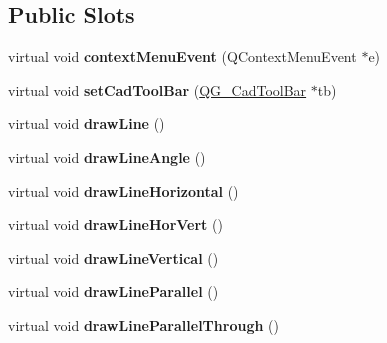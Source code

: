 \subsection*{Public Slots}
\begin{DoxyCompactItemize}
\item 
\hypertarget{classQG__CadToolBarLines_aff255f21be27cca5a8a2a75b50db5bf6}{virtual void {\bfseries context\-Menu\-Event} (Q\-Context\-Menu\-Event $\ast$e)}\label{classQG__CadToolBarLines_aff255f21be27cca5a8a2a75b50db5bf6}

\item 
\hypertarget{classQG__CadToolBarLines_a2cef003c3cb4285717c771850bcdea9c}{virtual void {\bfseries set\-Cad\-Tool\-Bar} (\hyperlink{classQG__CadToolBar}{Q\-G\-\_\-\-Cad\-Tool\-Bar} $\ast$tb)}\label{classQG__CadToolBarLines_a2cef003c3cb4285717c771850bcdea9c}

\item 
\hypertarget{classQG__CadToolBarLines_a22f3147ba60b1526fa564885d5d769c7}{virtual void {\bfseries draw\-Line} ()}\label{classQG__CadToolBarLines_a22f3147ba60b1526fa564885d5d769c7}

\item 
\hypertarget{classQG__CadToolBarLines_aae6ab002dd211edf7db823549fd01ad8}{virtual void {\bfseries draw\-Line\-Angle} ()}\label{classQG__CadToolBarLines_aae6ab002dd211edf7db823549fd01ad8}

\item 
\hypertarget{classQG__CadToolBarLines_a18621aab8d03f39f6a89737174429c6a}{virtual void {\bfseries draw\-Line\-Horizontal} ()}\label{classQG__CadToolBarLines_a18621aab8d03f39f6a89737174429c6a}

\item 
\hypertarget{classQG__CadToolBarLines_af014171186bf24712595f1f1d4ee02bf}{virtual void {\bfseries draw\-Line\-Hor\-Vert} ()}\label{classQG__CadToolBarLines_af014171186bf24712595f1f1d4ee02bf}

\item 
\hypertarget{classQG__CadToolBarLines_aae14da5f3439d49e067e5df375a072af}{virtual void {\bfseries draw\-Line\-Vertical} ()}\label{classQG__CadToolBarLines_aae14da5f3439d49e067e5df375a072af}

\item 
\hypertarget{classQG__CadToolBarLines_a878a180a8623996d39fe0b92e8ac84e0}{virtual void {\bfseries draw\-Line\-Parallel} ()}\label{classQG__CadToolBarLines_a878a180a8623996d39fe0b92e8ac84e0}

\item 
\hypertarget{classQG__CadToolBarLines_a9a4cfff3764c642ee062be752125646d}{virtual void {\bfseries draw\-Line\-Parallel\-Through} ()}\label{classQG__CadToolBarLines_a9a4cfff3764c642ee062be752125646d}


\end{DoxyCompactItemize}
